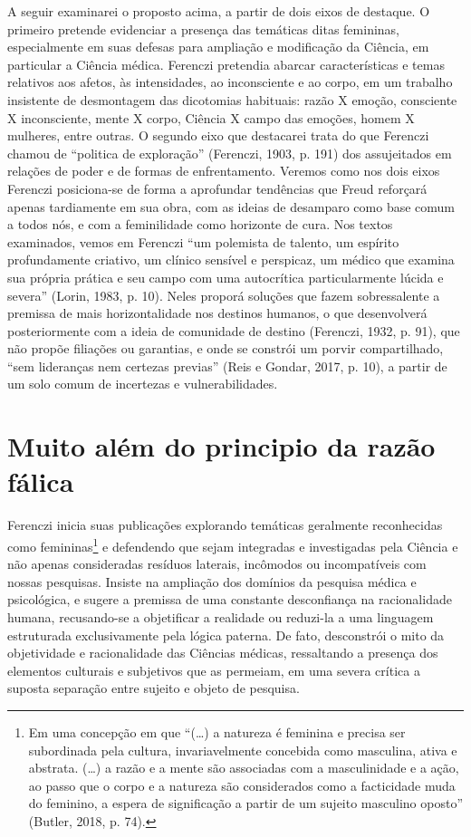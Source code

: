 A seguir examinarei o proposto acima, a partir de dois eixos de
destaque. O primeiro pretende evidenciar a presença das temáticas ditas
femininas, especialmente em suas defesas para ampliação e modificação da
Ciência, em particular a Ciência médica. Ferenczi pretendia abarcar
características e temas relativos aos afetos, às intensidades, ao
inconsciente e ao corpo, em um trabalho insistente de desmontagem das
dicotomias habituais: razão X emoção, consciente X inconsciente, mente X
corpo, Ciência X campo das emoções, homem X mulheres, entre outras. O
segundo eixo que destacarei trata do que Ferenczi chamou de ``politica
de exploração'' (Ferenczi, 1903, p. 191) dos assujeitados em relações de
poder e de formas de enfrentamento. Veremos como nos dois eixos Ferenczi
posiciona-se de forma a aprofundar tendências que Freud reforçará apenas
tardiamente em sua obra, com as ideias de desamparo como base comum a
todos nós, e com a feminilidade como horizonte de cura. Nos textos
examinados, vemos em Ferenczi ``um polemista de talento, um espírito
profundamente criativo, um clínico sensível e perspicaz, um médico que
examina sua própria prática e seu campo com uma autocrítica
particularmente lúcida e severa'' (Lorin, 1983, p. 10). Neles proporá
soluções que fazem sobressalente a premissa de mais horizontalidade nos
destinos humanos, o que desenvolverá posteriormente com a ideia de
comunidade de destino (Ferenczi, 1932, p. 91), que não propõe filiações
ou garantias, e onde se constrói um porvir compartilhado, ``sem
lideranças nem certezas previas'' (Reis e Gondar, 2017, p. 10), a partir
de um solo comum de incertezas e vulnerabilidades.

\section{Muito além do principio da razão fálica }

Ferenczi inicia suas publicações explorando temáticas geralmente
reconhecidas como femininas\footnote{Em uma concepção em que ``(\ldots{}) a
  natureza é feminina e precisa ser subordinada pela cultura,
  invariavelmente concebida como masculina, ativa e abstrata. (\ldots{}) a
  razão e a mente são associadas com a masculinidade e a ação, ao passo
  que o corpo e a natureza são considerados como a facticidade muda do
  feminino, a espera de significação a partir de um sujeito masculino
  oposto'' (Butler, 2018, p. 74).} e defendendo que sejam integradas e
investigadas pela Ciência e não apenas consideradas resíduos laterais,
incômodos ou incompatíveis com nossas pesquisas. Insiste na ampliação
dos domínios da pesquisa médica e psicológica, e sugere a premissa de
uma constante desconfiança na racionalidade humana, recusando-se a
objetificar a realidade ou reduzi-la a uma linguagem estruturada
exclusivamente pela lógica paterna. De fato, desconstrói o mito da
objetividade e racionalidade das Ciências médicas, ressaltando a
presença dos elementos culturais e subjetivos que as permeiam, em uma
severa crítica a suposta separação entre sujeito e objeto de pesquisa.

